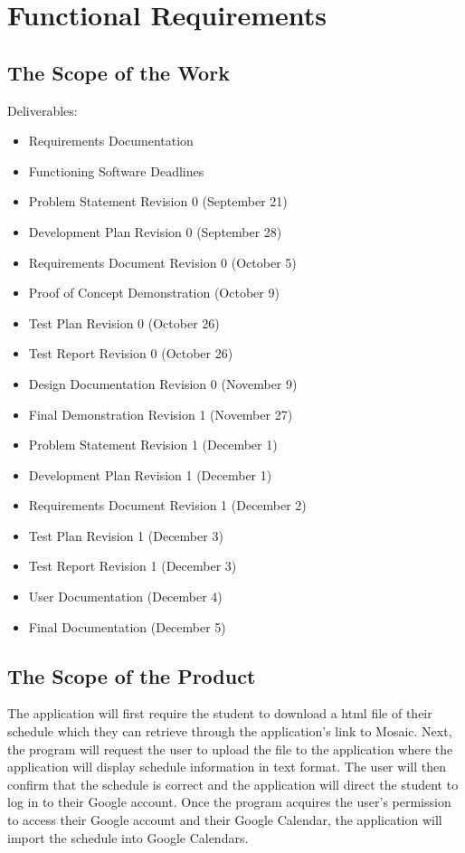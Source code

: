\documentclass[12pt, titlepage]{article}
\begin{document}
\section{Functional Requirements}

\subsection{The Scope of the Work} \label{deliverables}
Deliverables:
\begin{itemize}
\item Requirements Documentation
\item Functioning Software Deadlines
\item Problem Statement Revision 0  (September 21)
\item Development Plan Revision 0 (September 28)
\item Requirements Document Revision 0 (October 5)
\item Proof of Concept Demonstration (October 9)
\item Test Plan Revision 0 (October 26)
\item Test Report Revision 0 (October 26)
\item Design Documentation Revision 0 (November 9)
\item Final Demonstration Revision 1 (November 27)
\item Problem Statement Revision 1  (December 1)
\item Development Plan Revision 1 (December 1)
\item Requirements Document Revision 1 (December 2)
\item Test Plan Revision 1 (December 3)
\item Test Report Revision 1 (December 3)
\item User Documentation (December 4)
\item Final Documentation (December 5)
\end{itemize}
\subsection{The Scope of the Product}
\color{blue}
\hspace{5mm} The application will first require the student to download a html file of their schedule which they can retrieve through the application's link to Mosaic. Next, the program will request the user to upload the file to the application where the application will display schedule information in text format. The user will then confirm that the schedule is correct and the application will direct the student to log in to their Google account. Once the program acquires the user's permission to access their Google account and their Google Calendar, the application will import the schedule into Google Calendars. 
\color{black}
\end{document}
